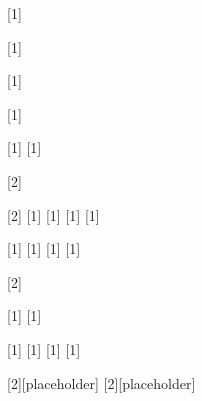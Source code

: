 \newrobustcmd{\scmul}[1]{%
}

\newrobustcmd{\foli}[1]{%
%
}

\newrobustcmd{\foliu}[1]{%
%
}

\newrobustcmd{\covderl}[1]{%
%
}

\newrobustcmd{\covder}[1]{%
%
}
\newrobustcmd{\coder}[1]{%
%
}

\newrobustcmd{\deltal}[2]{%
}


\newrobustcmd{\deltaud}[2]{%
}
\newrobustcmd{\etau}[1]{%
%
}
\newrobustcmd{\etaul}[1]{%
%
}
\newrobustcmd{\etad}[1]{%
%
}
\newrobustcmd{\etadl}[1]{%
%
}

\newrobustcmd{\epsul}[1]{%
}
\newrobustcmd{\epsdl}[1]{%
}
\newrobustcmd{\epsd}[1]{%
}
\newrobustcmd{\epsu}[1]{%
}

\newrobustcmd{\hfl}[2]{%
}


\newrobustcmd{\cbet}[1]{%
}
\newrobustcmd{\calp}[1]{%
}


\newrobustcmd{\alpg}[1]{%
}
\newrobustcmd{\betg}[1]{%
}
\newrobustcmd{\calpg}[1]{%
}
\newrobustcmd{\cbetg}[1]{%
}



\newrobustcmd{\alpm}[2][placeholder]{%
  {}
}
\newrobustcmd{\calpm}[2][placeholder]{%
}

